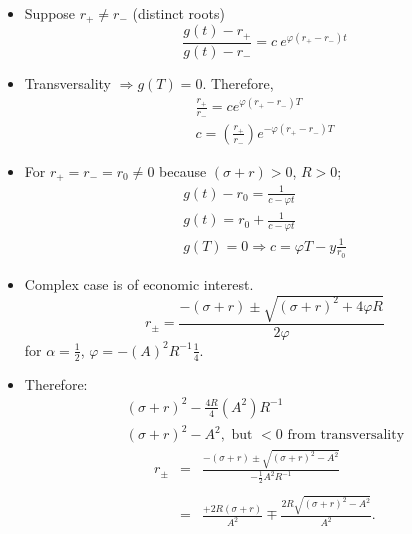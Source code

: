 \documentclass[12pt,compress,handout]{beamer}  %
\begin{document}
\begin{frame}

\small

\begin{itemize}[<+->]
\item Suppose $r_{+}\neq r_{-}$ (distinct roots)
\begin{equation*}
\frac{g(t)-r_{+}}{g(t)-r_{-}}=c\ e^{\varphi (r_{+}-r_{-})t}
\end{equation*}

\item Transversality $\Rightarrow g(T) = 0 $. Therefore,
\begin{gather*}
\frac{r_{+}}{r_{-}}=ce^{\varphi (r_{+}-r_{-})T} \\
c=\left( \frac{r_{+}}{r_{-}}\right) e^{-\varphi (r_{+}-r_{-})T}
\end{gather*}

\item For $r_{+}=r_{-}=r_{0} \neq 0$ because $(\sigma +r)>0$, $R>0$;
\begin{gather*}
g(t)-r_0=\frac{1}{c-\varphi t} \\
g(t)=r_0 + \frac{1}{c-\varphi t} \\
g(T)=0 \Rightarrow c=\varphi T - y\frac{1}{r_0}
\end{gather*}
\end{itemize}

\end{frame}


\begin{frame}
\begin{itemize}[<+->]
\item Complex case is of economic interest.
\begin{equation*}
r_{\pm }=\frac{-(\sigma +r) \pm \sqrt{(\sigma +r)^{2}+4\varphi
R}}{2\varphi }
\end{equation*}
for $\alpha =\frac{1}{2}$, $\varphi =-(A)^2R^{-1}\frac{1}{4}$.

\item Therefore:
\begin{gather*}
(\sigma +r)^{2}-\frac{4R}4(A^{2})R^{-1} \\
(\sigma +r)^2-A^{2}, \text{ but } <0 \text{ from transversality}
\end{gather*}
\begin{eqnarray*}
r_{\pm } &=&\frac{-(\sigma +r)\pm \sqrt{(\sigma +r)^2-A^2}}{-\frac
12A^2R^{-1}} \\
&& \\
&=&\frac{+2R(\sigma +r)}{A^2}\mp \frac{2R\sqrt{(\sigma
+r)^2-A^2}}{A^2}.
\end{eqnarray*}
\end{itemize}
\end{frame}
\end{document}

